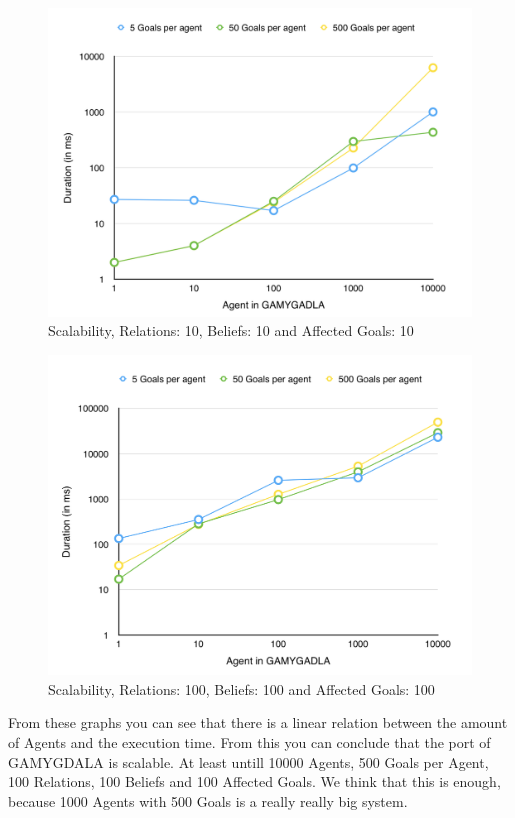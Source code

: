 \begin{figure}[H]
  \centering
  \includegraphics[scale=0.5]{scalability/2.jpg}
  \caption{Scalability, Relations: 10, Beliefs: 10 and Affected Goals: 10}
  \label{scala:second}
\end{figure}

\begin{figure}[H]
  \centering
  \includegraphics[scale=0.5]{scalability/3.jpg}
  \caption{Scalability, Relations: 100, Beliefs: 100 and Affected Goals: 100}
  \label{scala:third}
\end{figure}

From these graphs you can see that there is a linear relation between the amount of Agents and the execution time. From this you can conclude that the port of GAMYGDALA is scalable. At least untill 10000 Agents, 500 Goals per Agent, 100 Relations, 100 Beliefs and 100 Affected Goals. We think that this is enough, because 1000 Agents with 500 Goals is a really really big system.